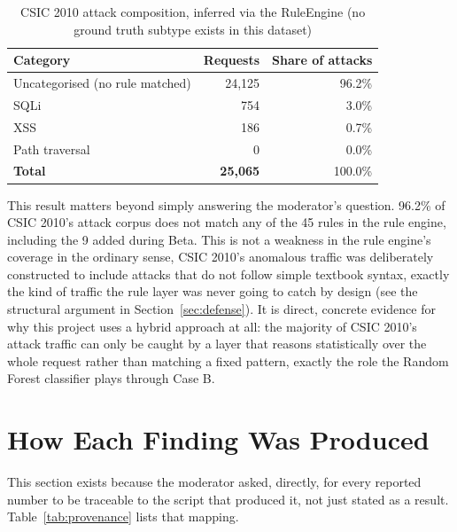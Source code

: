 \documentclass{llncs}
\begin{document}
\begin{table}[h]
\centering
\caption{CSIC 2010 attack composition, inferred via the RuleEngine (no ground truth subtype exists in this dataset)}
\label{tab:csic}
\begin{tabular}{lrr}
\toprule
\textbf{Category} & \textbf{Requests} & \textbf{Share of attacks} \\
\midrule
Uncategorised (no rule matched) & 24{,}125 & 96.2\% \\
SQLi & 754 & 3.0\% \\
XSS & 186 & 0.7\% \\
Path traversal & 0 & 0.0\% \\
\midrule
\textbf{Total} & \textbf{25{,}065} & 100.0\% \\
\bottomrule
\end{tabular}
\end{table}

This result matters beyond simply answering the moderator's question.
96.2\% of CSIC 2010's attack corpus does not match any of the 45 rules
in the rule engine, including the 9 added during Beta. This is not a
weakness in the rule engine's coverage in the ordinary sense, CSIC
2010's anomalous traffic was deliberately constructed to include attacks
that do not follow simple textbook syntax, exactly the kind of traffic
the rule layer was never going to catch by design (see the structural
argument in Section~\ref{sec:defense}). It is direct, concrete evidence
for why this project uses a hybrid approach at all: the majority of
CSIC 2010's attack traffic can only be caught by a layer that reasons
statistically over the whole request rather than matching a fixed
pattern, exactly the role the Random Forest classifier plays through
Case B.

\clearpage
\section{How Each Finding Was Produced}
\label{sec:findings}

This section exists because the moderator asked, directly, for every
reported number to be traceable to the script that produced it, not
just stated as a result. Table~\ref{tab:provenance} lists that mapping.
\end{document}
